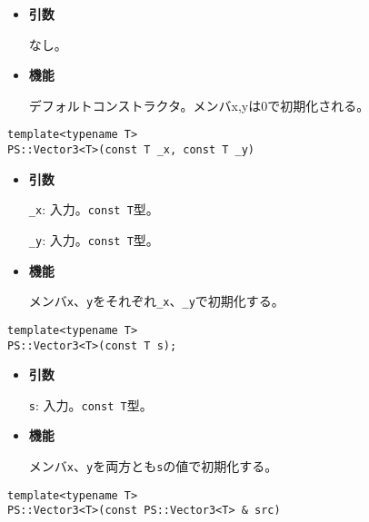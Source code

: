 \begin{itemize}

\item{{\bf 引数}}

なし。

\item{{\bf 機能}}

デフォルトコンストラクタ。メンバx,yは0で初期化される。

\end{itemize}

\begin{screen}
\begin{verbatim}
template<typename T>
PS::Vector3<T>(const T _x, const T _y)
\end{verbatim}
\end{screen}

\begin{itemize}

\item{{\bf 引数}}

{\tt \_x}: 入力。{\tt const T}型。

{\tt \_y}: 入力。{\tt const T}型。

\item{{\bf 機能}}

メンバ{\tt x}、{\tt y}をそれぞれ{\tt \_x}、{\tt \_y}で初期化する。

\end{itemize}

\begin{screen}
\begin{verbatim}
template<typename T>
PS::Vector3<T>(const T s);
\end{verbatim}
\end{screen}

\begin{itemize}

\item{{\bf 引数}}

{\tt s}: 入力。{\tt const T}型。

\item{{\bf 機能}}

メンバ{\tt x}、{\tt y}を両方とも{\tt s}の値で初期化する。

\end{itemize}

\begin{screen}
\begin{verbatim}
template<typename T>
PS::Vector3<T>(const PS::Vector3<T> & src)
\end{verbatim}
\end{screen}

